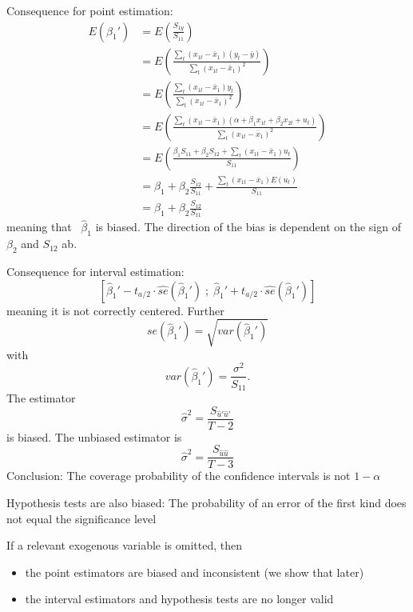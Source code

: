 \documentclass{article}
\begin{document}
Consequence for point estimation:
\begin{align*}
E(\hat\beta_1') &= E\left(\frac{S_{1y}}{S_{11}}\right)\\
&= E\left(\frac{\sum_t (x_{1t}-\bar x_1)(y_t-\bar y)}{\sum_t (x_{1t}-\bar x_1)^2}\right)\\
&= E\left(\frac{\sum_t (x_{1t}-\bar x_1)y_t}{\sum_t (x_{1t}-\bar x_1)^2}\right)\\
&= E\left(\frac{\sum_t (x_{1t}-\bar x_1)(\alpha+\beta_1 x_{1t}+\beta_2 x_{2t}+u_t)}{\sum_t (x_{1t}-\bar x_1)^2}\right)\\
&= E\left(\frac{\beta_1 S_{11}+\beta_2 S_{12}+\sum_t (x_{1t}-\bar x_1)u_t}{S_{11}}\right)\\
&= \beta_1+\beta_2 \frac{S_{12}}{S_{11}}+\frac{\sum_t (x_{1t}-\bar x_1)E(u_t)}{S_{11}}\\
&= \beta_1+\beta_2 \frac{S_{12}}{S_{11}}
\end{align*}
meaning that \ $\hat\beta_1$ is biased. The direction of the bias is dependent on the sign of $\beta_2$ and $S_{12}$ ab.

Consequence for interval estimation:
\[ [\hat\beta_1'-t_{a/2}\cdot \widehat{se}(\hat\beta_1')\;;
\;\hat\beta_1'+t_{a/2}\cdot \widehat{se}(\hat\beta_1')] \]
meaning it is not correctly centered. Further
\[ se(\hat{\beta}_{1}')=\sqrt{var( \hat{\beta}_1') } \]
with 
\[ var(\hat\beta_1') =\frac{\sigma^2}{S_{11}}. \]
The estimator
\[ \hat{\sigma}^{2}=\frac{S_{\widehat{u}'\widehat{u}'}}{T-2}\]
is biased. The unbiased estimator is
\[ \hat{\sigma}^{2}=\frac{S_{\widehat{u}\widehat{u}}}{T-3} \]
 Conclusion: The coverage probability of the confidence intervals is
not $1-\alpha $

Hypothesis tests are also biased: The probability of an error of the
first kind does not equal the significance level

If a relevant exogenous variable is omitted, then 
\begin{itemize}
	\item the point estimators are biased and inconsistent (we show that later)
	
	\item the interval estimators and hypothesis tests are no longer valid
\end{itemize}
\end{document}
